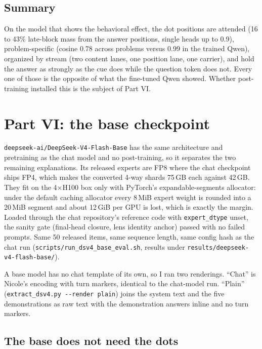 \documentclass[11pt]{article}
\newcommand{\ttt}[1]{\texttt{\small #1}}
\begin{document}
\subsection{Summary}

On the model that shows the behavioral effect, the dot positions are attended (16 to 43\% late-block mass from the answer positions, single heads up to 0.9), problem-specific (cosine 0.78 across problems versus 0.99 in the trained Qwen), organized by stream (two content lanes, one position lane, one carrier), and hold the answer as strongly as the cue does while the question token does not. Every one of those is the opposite of what the fine-tuned Qwen showed. Whether post-training installed this is the subject of Part VI.


\section{Part VI: the base checkpoint}

\ttt{deepseek-ai/DeepSeek-V4-Flash-Base} has the same architecture and pretraining as the chat model and no post-training, so it separates the two remaining explanations. Its released experts are FP8 where the chat checkpoint ships FP4, which makes the converted 4-way shards 75\,GB each against 42\,GB. They fit on the 4$\times$H100 box only with PyTorch's expandable-segments allocator: under the default caching allocator every 8\,MiB expert weight is rounded into a 20\,MiB segment and about 12\,GiB per GPU is lost, which is exactly the margin. Loaded through the chat repository's reference code with \ttt{expert\_dtype} unset, the sanity gate (final-head closure, lens identity anchor) passed with no failed prompts. Same 50 released items, same sequence length, same config hash as the chat run (\ttt{scripts/run\_dsv4\_base\_eval.sh}, results under \ttt{results/deepseek-v4-flash-base/}).

A base model has no chat template of its own, so I ran two renderings. ``Chat'' is Nicole's encoding with turn markers, identical to the chat-model run. ``Plain'' (\ttt{extract\_dsv4.py -{}-render plain}) joins the system text and the five demonstrations as raw text with the demonstration answers inline and no turn markers.

\subsection{The base does not need the dots}
\end{document}
